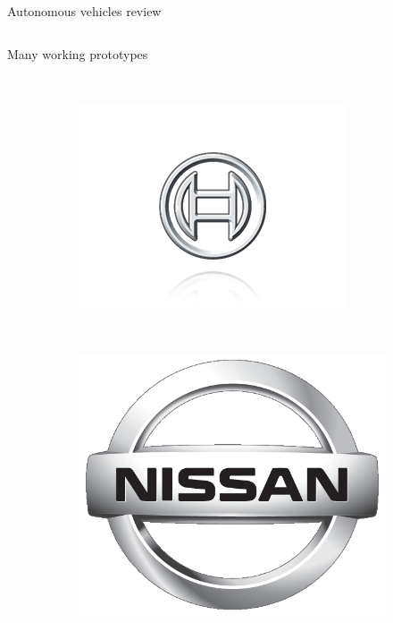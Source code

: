 \begin{frame}{Autonomous vehicles review}
\begin{columns}[T]
\begin{center}
\begin{overlayarea}{\textwidth}{\textheight}
{\begin{block}{Many working prototypes}
\begin{figure}[t]
\begin{subfigure}[b]{0.2\textwidth}
	      \end{subfigure}
	      ~
	      \begin{subfigure}[b]{0.2\textwidth}
		\includegraphics[width=\textwidth]{bosch}
	      \end{subfigure}
	      ~
	      \begin{subfigure}[b]{0.2\textwidth}
		\includegraphics[width=\textwidth]{nissan}
	      \end{subfigure}
	      \\~\\
	      \begin{subfigure}[b]{0.2\textwidth}

\end{subfigure}
\end{figure}
\end{block}}
\end{overlayarea}
\end{center}
\end{columns}
\end{frame}
